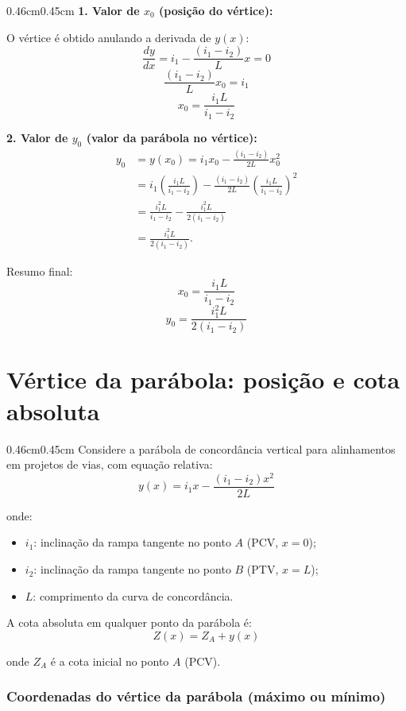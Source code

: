 \documentclass[12pt,letterpaper]{article}
\newenvironment{corpo}{\begin{adjustwidth}{0.46cm}{0.45cm}\justifying}{\end{adjustwidth}}
\begin{document}
\begin{corpo}
\textbf{1. Valor de $x_0$ (posição do vértice):}

O vértice é obtido anulando a derivada de $y(x)$:
\[
\frac{dy}{dx}=i_1-\frac{(i_1-i_2)}{L}x=0
\]
\[
\frac{(i_1-i_2)}{L}x_0=i_1
\]
\[
 x_0=\frac{i_1L}{i_1-i_2}
\]

\textbf{2. Valor de $y_0$ (valor da parábola no vértice):}
\[
\begin{aligned}
y_0&=y(x_0)=i_1x_0-\frac{(i_1-i_2)}{2L}x_0^2 \\
&=i_1\left(\frac{i_1L}{i_1-i_2}\right)
-\frac{(i_1-i_2)}{2L}\left(\frac{i_1L}{i_1-i_2}\right)^2 \\
&=\frac{i_1^2L}{i_1-i_2}-\frac{i_1^2L}{2(i_1-i_2)} \\
&=\frac{i_1^2L}{2(i_1-i_2)}.
\end{aligned}
\]

Resumo final:
\[
 x_0=\frac{i_1L}{i_1-i_2}
\]
\[
 y_0=\frac{i_1^2L}{2(i_1-i_2)}
\]
\end{corpo}

\section*{Vértice da parábola: posição e cota absoluta}

\begin{corpo}
Considere a parábola de concordância vertical para alinhamentos em projetos de vias, com equação relativa:
\[
 y(x)=i_1x-\frac{(i_1-i_2)x^2}{2L}
\]

onde:
\begin{itemize}
    \item $i_1$: inclinação da rampa tangente no ponto $A$ (PCV, $x=0$);
    \item $i_2$: inclinação da rampa tangente no ponto $B$ (PTV, $x=L$);
    \item $L$: comprimento da curva de concordância.
\end{itemize}

A cota absoluta em qualquer ponto da parábola é:
\[
 Z(x)=Z_A+y(x)
\]

onde $Z_A$ é a cota inicial no ponto $A$ (PCV).
\end{corpo}

\subsubsection*{Coordenadas do vértice da parábola (máximo ou mínimo)}
\end{document}
